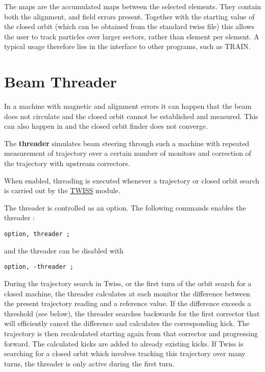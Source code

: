 The maps are the accumulated maps between the selected elements. They
contain both the alignment, and field errors present. Together with the
starting value of the closed orbit (which can be obtained from the
standard twiss file) this allows the user to track particles over larger
sectors, rather than element per element. A typical usage therefore lies
in the interface to other programs, such as TRAIN.  


%

\section{Beam Threader} 

In a machine with magnetic and alignment errors it can happen that the
beam does not circulate and the closed orbit cannot be established and
measured. This can also happen in \madx and the closed orbit finder does
not converge. 

The \textbf{threader} simulates beam steering through such a machine
with repeated measurement of trajectory over a certain number of
monitors and correction of the trajectory with upstream correctors.   

When enabled, threading is executed whenever a trajectory or closed
orbit search is carried out by the \href{../twiss/twiss.html}{TWISS}
module.   

The threader is controlled as an option. 
The following \madx commands enables the threader :
\begin{verbatim}
option, threader ;
\end{verbatim}  
and the threader can be disabled with
\begin{verbatim}
option, -threader ;
\end{verbatim}  

During the trajectory search in Twiss, or the first turn of the orbit
search for a closed machine, the threader calculates at each monitor the
difference between the present trajectory reading and a reference value.  
If the difference exceeds a threshold (see below), the threader searches
backwards for the first corrector that will efficiently cancel the
difference and calculates the corresponding kick. The trajectory is then
recalculated starting again from that corrector and progressing
forward. The calculated kicks are added to already existing kicks. If
Twiss is searching for a closed orbit which involves tracking this
trajectory over many turns, the threader is only active during the first
turn.  

